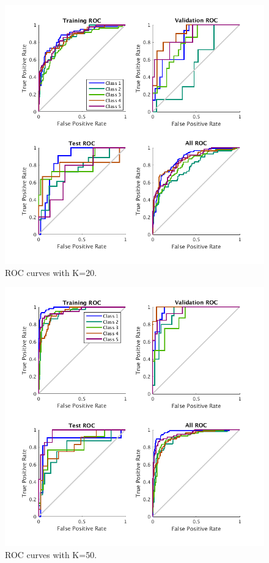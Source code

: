 \documentclass{article}
\begin{document}
\begin{figure}[h]
\centering
\includegraphics[scale=0.5]{Figures/Metrics/roc_k20}
\caption{ROC curves with K=20.}
\label{fig:r20}
\end{figure}
\begin{figure}[h]
\centering
\includegraphics[scale=0.5]{Figures/Metrics/roc_k50}
\caption{ROC curves with K=50.}
\label{fig:r50}
\end{figure}
\end{document}
